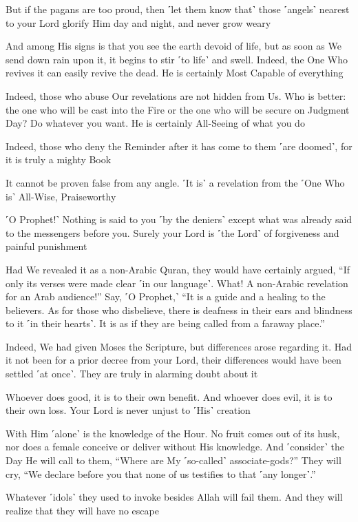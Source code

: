 But if the pagans are too proud, then ˹let them know that˺ those ˹angels˺ nearest to your Lord glorify Him day and night, and never grow weary

And among His signs is that you see the earth devoid of life, but as soon as We send down rain upon it, it begins to stir ˹to life˺ and swell. Indeed, the One Who revives it can easily revive the dead. He is certainly Most Capable of everything

Indeed, those who abuse Our revelations are not hidden from Us. Who is better: the one who will be cast into the Fire or the one who will be secure on Judgment Day? Do whatever you want. He is certainly All-Seeing of what you do

Indeed, those who deny the Reminder after it has come to them ˹are doomed˺, for it is truly a mighty Book

It cannot be proven false from any angle. ˹It is˺ a revelation from the ˹One Who is˺ All-Wise, Praiseworthy

˹O Prophet!˺ Nothing is said to you ˹by the deniers˺ except what was already said to the messengers before you. Surely your Lord is ˹the Lord˺ of forgiveness and painful punishment

Had We revealed it as a non-Arabic Quran, they would have certainly argued, “If only its verses were made clear ˹in our language˺. What! A non-Arabic revelation for an Arab audience!” Say, ˹O Prophet,˺ “It is a guide and a healing to the believers. As for those who disbelieve, there is deafness in their ears and blindness to it ˹in their hearts˺. It is as if they are being called from a faraway place.”

Indeed, We had given Moses the Scripture, but differences arose regarding it. Had it not been for a prior decree from your Lord, their differences would have been settled ˹at once˺. They are truly in alarming doubt about it

Whoever does good, it is to their own benefit. And whoever does evil, it is to their own loss. Your Lord is never unjust to ˹His˺ creation

With Him ˹alone˺ is the knowledge of the Hour. No fruit comes out of its husk, nor does a female conceive or deliver without His knowledge. And ˹consider˺ the Day He will call to them, “Where are My ˹so-called˺ associate-gods?” They will cry, “We declare before you that none of us testifies to that ˹any longer˺.”

Whatever ˹idols˺ they used to invoke besides Allah will fail them. And they will realize that they will have no escape

